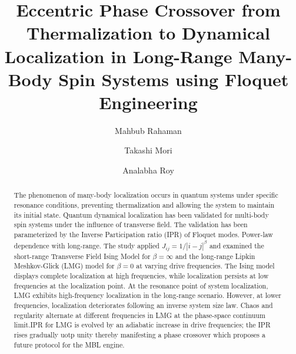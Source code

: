 \documentclass[%
reprint,
superscriptaddress,
amsmath,amssymb,
aps,
prb,
]{revtex4-2}
\begin{document}
	
	
	\title{Eccentric Phase Crossover from Thermalization to Dynamical Localization  in Long-Range Many-Body Spin Systems using Floquet Engineering}%
	
	\author{Mahbub Rahaman}
	\author{Takashi Mori}
	\author{Analabha Roy}
	
	\begin{abstract}
		The phenomenon of many-body localization occurs in quantum systems under specific resonance conditions, preventing thermalization and allowing the system to maintain its initial state. Quantum dynamical localization has been validated for multi-body spin systems under the influence of transverse field. The validation has been parameterized by the Inverse Participation ratio (IPR) of Floquet modes. Power-law dependence with long-range. The study applied $J_{ij} = 1/|i-j|^{\beta}$ and examined the short-range Transverse Field Ising Model for $\beta = \infty$ and the long-range Lipkin Meshkov-Glick (LMG) model for $\beta = 0$ at varying drive frequencies. The Ising model displays complete localization at high frequencies, while localization persists at low frequencies at the localization point. At the resonance point of system localization, LMG exhibits high-frequency localization in the long-range scenario. However, at lower frequencies, localization deteriorates following an inverse system size law. Chaos and regularity alternate at different frequencies in LMG at the phase-space continuum limit.IPR for LMG is evolved by an adiabatic increase in drive frequencies; the IPR rises gradually uotp unity  thereby manifesting a phase crossover which proposes a future protocol for the MBL engine.
		
	\end{abstract}
	
\end{document}
